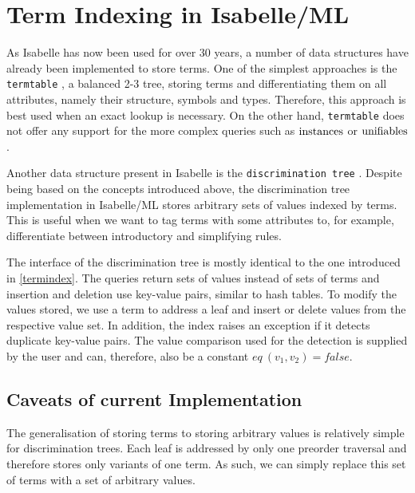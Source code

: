 
\section{Term Indexing in Isabelle/ML}
As Isabelle has now been used for over 30 years, a number of data structures have already been implemented to store terms. One of the simplest approaches is the \lstinline{termtable} \cite{noauthor_termtables_nodate}, a balanced 2-3 tree, storing terms and differentiating them on all attributes, namely their structure, symbols and types. Therefore, this approach is best used when an exact lookup is necessary. On the other hand, \lstinline{termtable} does not offer any support for the more complex queries such as $\mathrm{instances}$ or $\mathrm{unifiables}$.

Another data structure present in Isabelle is the \lstinline{discrimination tree} \cite{noauthor_discrimination_nodate}. Despite being based on the concepts introduced above, the discrimination tree implementation in Isabelle/ML stores arbitrary sets of values indexed by terms. This is useful when we want to tag terms with some attributes to, for example, differentiate between introductory and simplifying rules.

The interface of the discrimination tree is mostly identical to the one introduced in \cref{termindex}. The queries return sets of values instead of sets of terms and insertion and deletion use key-value pairs, similar to hash tables. To modify the values stored, we use a term to address a leaf and insert or delete values from the respective value set. In addition, the index raises an exception if it detects duplicate key-value pairs. The value comparison used for the detection is supplied by the user and can, therefore, also be a constant $eq\ (v_{1},v_{2}) = false$.


\subsection{Caveats of current Implementation}
The generalisation of storing terms to storing arbitrary values is relatively simple for discrimination trees. Each leaf is addressed by only one preorder traversal and therefore stores only variants of one term. As such, we can simply replace this set of terms with a set of arbitrary values.

